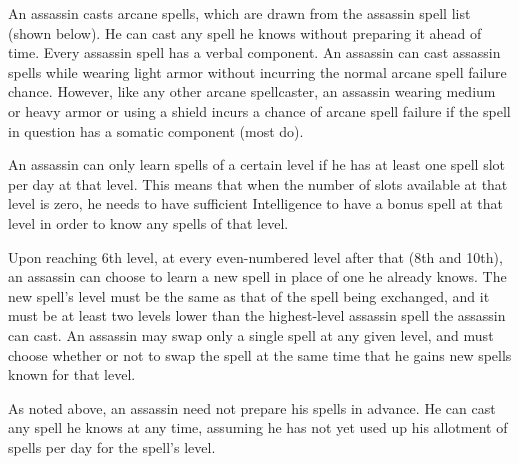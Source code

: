 {An assassin casts arcane spells, which are drawn from the assassin spell list (shown below). He can cast any spell he knows without preparing it ahead of time. Every assassin spell has a verbal component. An assassin can cast assassin spells while wearing light armor without incurring the normal arcane spell failure chance. However, like any other arcane spellcaster, an assassin wearing medium or heavy armor or using a shield incurs a chance of arcane spell failure if the spell in question has a somatic component (most do).


An assassin can only learn spells of a certain level if he has at least one spell slot per day at that level. This means that when the number of slots available at that level is zero, he needs to have sufficient Intelligence to have a bonus spell at that level in order to know any spells of that level.

Upon reaching 6th level, at every even-numbered level after that (8th and 10th), an assassin can choose to learn a new spell in place of one he already knows. The new spell's level must be the same as that of the spell being exchanged, and it must be at least two levels lower than the highest-level assassin spell the assassin can cast. An assassin may swap only a single spell at any given level, and must choose whether or not to swap the spell at the same time that he gains new spells known for that level.

As noted above, an assassin need not prepare his spells in advance. He can cast any spell he knows at any time, assuming he has not yet used up his allotment of spells per day for the spell's level.

}
